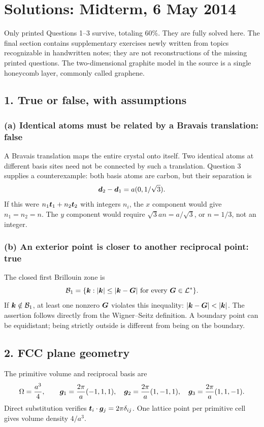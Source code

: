 \chapter{Solutions: Midterm, 6 May 2014}
\label{s:theory-2014-05-midterm}
\begin{sourceNote}
Only printed Questions 1--3 survive, totaling 60\%. They are fully solved here. The final section contains supplementary exercises newly written from topics recognizable in handwritten notes; they are not reconstructions of the missing printed questions. The two-dimensional graphite model in the source is a single honeycomb layer, commonly called graphene.
\end{sourceNote}

\section*{1. True or false, with assumptions}
\subsection*{(a) Identical atoms must be related by a Bravais translation: false}
A Bravais translation maps the entire crystal onto itself. Two identical atoms at different basis sites need not be connected by such a translation. Question 3 supplies a counterexample: both basis atoms are carbon, but their separation is
\[
\boldsymbol{d}_2-\boldsymbol{d}_1=a(0,1/\sqrt3).
\]
If this were $n_1\boldsymbol{t}_1+n_2\boldsymbol{t}_2$ with integers $n_i$, the $x$ component would give $n_1=n_2=n$. The $y$ component would require $\sqrt3an=a/\sqrt3$, or $n=1/3$, not an integer.

\subsection*{(b) An exterior point is closer to another reciprocal point: true}
The closed first Brillouin zone is
\[
\mathcal B_1=\{\boldsymbol{k}:|\boldsymbol{k}|\leq|\boldsymbol{k}-\boldsymbol{G}|
\text{ for every }\boldsymbol{G}\in\mathcal L^*\}.
\]
If $\boldsymbol{k}\notin\mathcal B_1$, at least one nonzero $\boldsymbol{G}$ violates this inequality: $|\vct k-\vct G|<|\vct k|$. The assertion follows directly from the Wigner--Seitz definition. A boundary point can be equidistant; being strictly outside is different from being on the boundary.

\section*{2. FCC plane geometry}
The primitive volume and reciprocal basis are
\[
\Omega=\frac{a^3}{4},\qquad
\boldsymbol{g}_1=\frac{2\pi}{a}(-1,1,1),\quad
\boldsymbol{g}_2=\frac{2\pi}{a}(1,-1,1),\quad
\boldsymbol{g}_3=\frac{2\pi}{a}(1,1,-1).
\]
Direct substitution verifies $\boldsymbol{t}_i\cdot\boldsymbol{g}_j=2\pi\delta_{ij}$. One lattice point per primitive cell gives volume density $4/a^3$.

